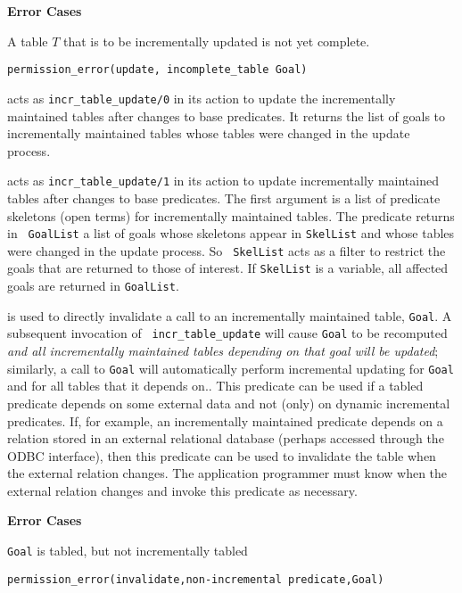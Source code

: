 \begin{description}
{\bf Error Cases}
\bi
\item A table $T$ that is to be incrementally updated is not yet
  complete.  
\bi
\item 	{\tt permission\_error(update, incomplete\_table Goal)}
\ei
\ei

acts as {\tt incr\_table\_update/0} in its action to update the
incrementally maintained tables after changes to base predicates.  It
returns the list of goals to incrementally maintained tables whose
tables were changed in the update process.

acts as {\tt incr\_table\_update/1} in its action to update
incrementally maintained tables after changes to base predicates.  The
first argument is a list of predicate skeletons (open terms) for
incrementally maintained tables.  The predicate returns in {\tt
  GoalList} a list of goals whose skeletons appear in {\tt SkelList}
and whose tables were changed in the update process.  So {\tt
  SkelList} acts as a filter to restrict the goals that are returned
to those of interest.  If {\tt SkelList} is a variable, all affected
goals are returned in {\tt GoalList}.

is used to directly invalidate a call to an incrementally maintained
table, {\tt Goal}.  A subsequent invocation of {\tt
  incr\_table\_update} will cause {\tt Goal} to be recomputed {\em and
  all incrementally maintained tables depending on that goal will be
  updated}; similarly, a call to {\tt Goal} will automatically perform
incremental updating for {\tt Goal} and for all tables that it depends
on..  This predicate can be used if a tabled predicate depends on some
external data and not (only) on dynamic incremental predicates.  If,
for example, an incrementally maintained predicate depends on a
relation stored in an external relational database (perhaps accessed
through the ODBC interface), then this predicate can be used to
invalidate the table when the external relation changes.  The
application programmer must know when the external relation changes
and invoke this predicate as necessary.

{\bf Error Cases}
\bi
\item 	{\tt Goal} is tabled, but not incrementally tabled
\bi
\item 	{\tt permission\_error(invalidate,non-incremental predicate,Goal)}
\ei
\ei


\end{description}
